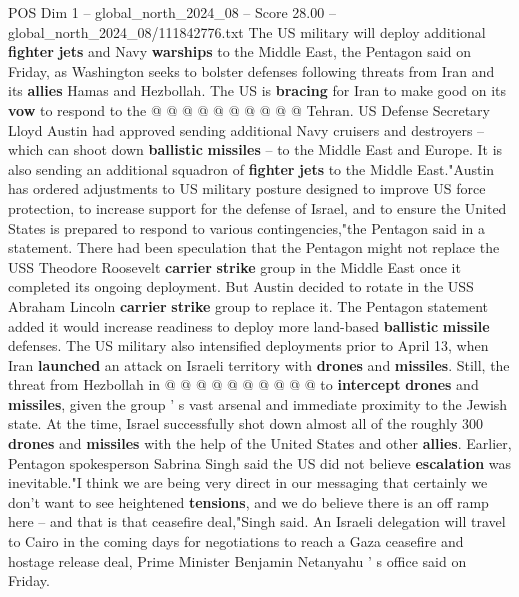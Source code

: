 \begin{textsample}{POS Dim 1 – global\_north\_2024\_08 – Score 28.00 – global\_north\_2024\_08/111842776.txt}
The US military will deploy additional \textbf{fighter} \textbf{jets} and Navy \textbf{warships} to the Middle East, the Pentagon said on Friday, as Washington seeks to bolster defenses following threats from Iran and its \textbf{allies} Hamas and Hezbollah.
The US is \textbf{bracing} for Iran to make good on its \textbf{vow} to respond to the @ @ @ @ @ @ @ @ @ @ Tehran.
US Defense Secretary Lloyd Austin had approved sending additional Navy cruisers and destroyers -- which can shoot down \textbf{ballistic} \textbf{missiles} -- to the Middle East and Europe.
It is also sending an additional squadron of \textbf{fighter} \textbf{jets} to the Middle East."Austin has ordered adjustments to US military posture designed to improve US force protection, to increase support for the defense of Israel, and to ensure the United States is prepared to respond to various contingencies,"the Pentagon said in a statement.
There had been speculation that the Pentagon might not replace the USS Theodore Roosevelt \textbf{carrier} \textbf{strike} group in the Middle East once it completed its ongoing deployment.
But Austin decided to rotate in the USS Abraham Lincoln \textbf{carrier} \textbf{strike} group to replace it.
The Pentagon statement added it would increase readiness to deploy more land-based \textbf{ballistic} \textbf{missile} defenses.
The US military also intensified deployments prior to April 13, when Iran \textbf{launched} an attack on Israeli territory with \textbf{drones} and \textbf{missiles}.
Still, the threat from Hezbollah in @ @ @ @ @ @ @ @ @ @ to \textbf{intercept} \textbf{drones} and \textbf{missiles}, given the group ' s vast arsenal and immediate proximity to the Jewish state.
At the time, Israel successfully shot down almost all of the roughly 300 \textbf{drones} and \textbf{missiles} with the help of the United States and other \textbf{allies}.
Earlier, Pentagon spokesperson Sabrina Singh said the US did not believe \textbf{escalation} was inevitable."I think we are being very direct in our messaging that certainly we don't want to see heightened \textbf{tensions}, and we do believe there is an off ramp here -- and that is that ceasefire deal,"Singh said.
An Israeli delegation will travel to Cairo in the coming days for negotiations to reach a Gaza ceasefire and hostage release deal, Prime Minister Benjamin Netanyahu ' s office said on Friday.

\end{textsample}
